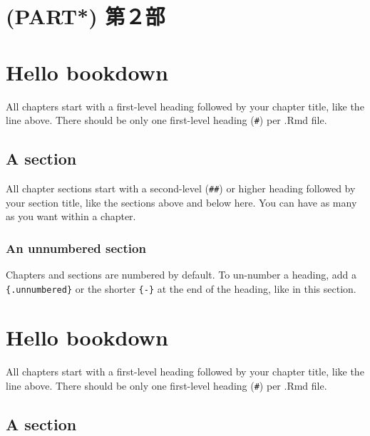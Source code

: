 \documentclass[
]{book}
\theoremstyle{definition}
\theoremstyle{definition}
\theoremstyle{definition}
\theoremstyle{definition}
\theoremstyle{remark}
\begin{document}
\hypertarget{part-ux7b2cuxff12ux90e8}{%
\chapter{(PART*) 第２部}\label{part-ux7b2cuxff12ux90e8}}

\hypertarget{hello-bookdown-1}{%
\chapter{Hello bookdown}\label{hello-bookdown-1}}

All chapters start with a first-level heading followed by your chapter title, like the line above. There should be only one first-level heading (\texttt{\#}) per .Rmd file.

\hypertarget{a-section-1}{%
\section{A section}\label{a-section-1}}

All chapter sections start with a second-level (\texttt{\#\#}) or higher heading followed by your section title, like the sections above and below here. You can have as many as you want within a chapter.

\hypertarget{an-unnumbered-section-1}{%
\subsection*{An unnumbered section}\label{an-unnumbered-section-1}}

Chapters and sections are numbered by default. To un-number a heading, add a \texttt{\{.unnumbered\}} or the shorter \texttt{\{-\}} at the end of the heading, like in this section.

\hypertarget{hello-bookdown-2}{%
\chapter{Hello bookdown}\label{hello-bookdown-2}}

All chapters start with a first-level heading followed by your chapter title, like the line above. There should be only one first-level heading (\texttt{\#}) per .Rmd file.

\hypertarget{a-section-2}{%
\section{A section}\label{a-section-2}}
\end{document}
